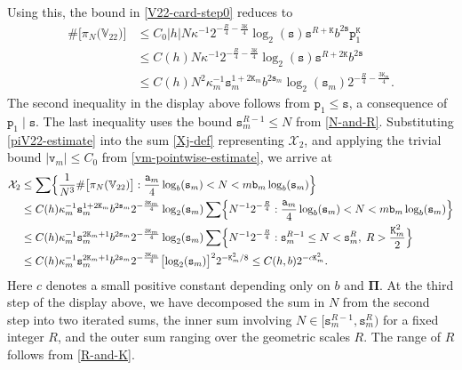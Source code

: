 \documentclass[12pt, twoside]{article}
\theoremstyle{definition}
\numberwithin{equation}{section}
\begin{document}
Using this, the bound in \eqref{V22-card-step0} reduces to
\begin{align}
\# \bigl[ \pi_N \bigl( \mathbb V_{22} \bigr) \bigr]  &\leq C_0 {|h|} N \kappa^{-1} 2^{-\frac{R}{4} - \frac{3\mathtt K}{4}} \log_2(\mathtt s) \mathtt s^{R + \mathtt K} b^{2\mathtt s} \mathtt p_1^{\mathtt K} \nonumber \\  &\leq C(h) N \kappa^{-1} 2^{-\frac{R}{4} - \frac{3\mathtt K}{4}} \log_2(\mathtt s) \mathtt s^{R + 2\mathtt K} b^{2\mathtt s} \nonumber \\ 
&\leq C(h) N^2 \kappa_m^{-1} \mathtt s_m^{1 + 2\mathtt K_m} b^{2 \mathtt s_m} \log_2(\mathtt s_m) 2^{-\frac{R}{4} - \frac{3\mathtt K_m}{4}}.  \label{piV22-estimate}
\end{align}   
The second inequality in the display above follows from $\mathtt p_1 \leq \mathtt s$, a consequence of $\mathtt p_1 \mid \mathtt s$. The last inequality uses the bound $\mathtt s_{m}^{R-1} \leq N$ from \eqref{N-and-R}. Substituting \eqref{piV22-estimate} into the sum \eqref{Xj-def} representing $\mathcal X_2$, and applying the trivial bound $|\mathtt v_m| \leq C_0$ from \eqref{vm-pointwise-estimate}, we arrive at
\begin{align}
\mathcal X_2 &\leq \sum \Bigl\{\frac{1}{N^3} \# \bigl[ \pi_N(\mathbb V_{22}) \bigr] : \frac{\mathtt a_m}{4} \log_b(\mathtt s_m) < N < m \mathtt b_m \log_b(\mathtt s_m) \Bigr\} \nonumber \\
&\leq C(h) \kappa_m^{-1} \mathtt s_m^{1 + 2\mathtt K_m} b^{2 \mathtt s_m} 2^{-\frac{3\mathtt K_m}{4}}\log_2(\mathtt s_m) \sum \Bigl\{N^{-1} 2^{-\frac{R}{4}} : \frac{\mathtt a_m}{4} \log_b(\mathtt s_m) < N < m \mathtt b_m \log_b(\mathtt s_m)  \Bigr\} \nonumber \\
&\leq C(h) \kappa_m^{-1} \mathtt s_m^{2\mathtt K_m+1} b^{2 \mathtt s_m} 2^{-\frac{3\mathtt K_m}{4}}\log_2(\mathtt s_m)  \sum  \Bigl\{N^{-1} 2^{-\frac{R}{4}}  : \mathtt s_m^{R-1} \leq N < \mathtt s_m^R, \; R > \frac{\mathtt K_m^2}{2} \Bigr\} \nonumber \\
&\leq C(h) \kappa_m^{-1} \mathtt s_m^{2\mathtt K_m+1}  b^{2 \mathtt s_m} 2^{-\frac{3\mathtt K_m}{4}} \bigl[ \log_2(\mathtt s_m) \bigr]^2 2^{- \mathtt K_m^2/8} \leq C(h, b) 2^{- c\mathtt K_m^2}. \label{X2-bound} 
\end{align}  
{Here $c$} denotes a small positive constant depending only on $b$ and $\pmb{\Pi}$. At the third step of the display above, we have decomposed the sum in $N$ from the second step into two iterated sums, the inner sum involving $N \in [\mathtt s_m^{R-1}, \mathtt s_m^R)$ for a fixed integer $R$, and the outer sum ranging over the geometric scales $R$. The range of $R$ follows from \eqref{R-and-K}.  
\end{document}
